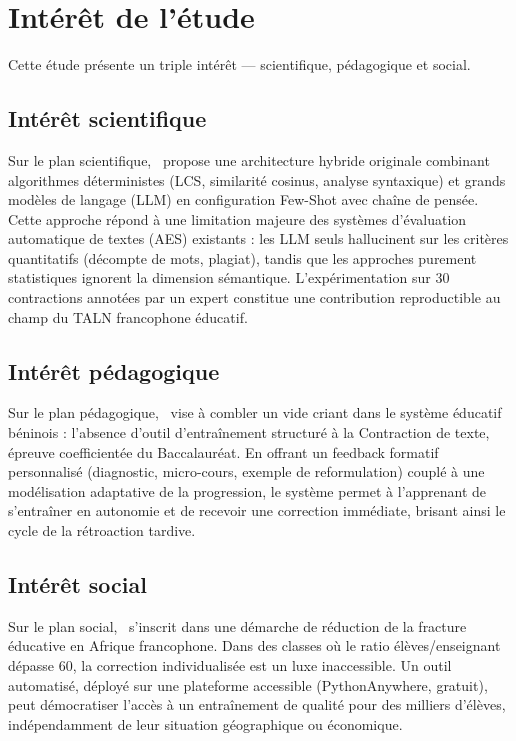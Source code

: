 \section*{Intérêt de l'étude}

Cette étude présente un triple intérêt — scientifique, pédagogique et social.

\subsection*{Intérêt scientifique}

Sur le plan scientifique, \AZIZA\ propose une architecture hybride originale combinant algorithmes déterministes (LCS, similarité cosinus, analyse syntaxique) et grands modèles de langage (LLM) en configuration Few-Shot avec chaîne de pensée. Cette approche répond à une limitation majeure des systèmes d'évaluation automatique de textes (AES) existants : les LLM seuls hallucinent sur les critères quantitatifs (décompte de mots, plagiat), tandis que les approches purement statistiques ignorent la dimension sémantique. L'expérimentation sur 30 contractions annotées par un expert constitue une contribution reproductible au champ du TALN francophone éducatif.

\subsection*{Intérêt pédagogique}

Sur le plan pédagogique, \AZIZA\ vise à combler un vide criant dans le système éducatif béninois : l'absence d'outil d'entraînement structuré à la Contraction de texte, épreuve coefficientée du Baccalauréat. En offrant un feedback formatif personnalisé (diagnostic, micro-cours, exemple de reformulation) couplé à une modélisation adaptative de la progression, le système permet à l'apprenant de s'entraîner en autonomie et de recevoir une correction immédiate, brisant ainsi le cycle de la rétroaction tardive.

\subsection*{Intérêt social}

Sur le plan social, \AZIZA\ s'inscrit dans une démarche de réduction de la fracture éducative en Afrique francophone. Dans des classes où le ratio élèves/enseignant dépasse 60, la correction individualisée est un luxe inaccessible. Un outil automatisé, déployé sur une plateforme accessible (PythonAnywhere, gratuit), peut démocratiser l'accès à un entraînement de qualité pour des milliers d'élèves, indépendamment de leur situation géographique ou économique.

